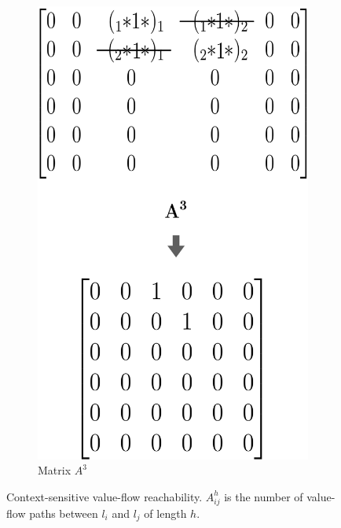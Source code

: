 \documentclass[xcolor=table,english]{beamer}
\begin{document}
\begin{frame}[fragile]
\begin{figure}[w]
\begin{subfigure}[b]{0.297\textwidth}
            \includegraphics[width=\textwidth]{figures/cfpq_3.png}
            \caption{Matrix $A^3$}
        \end{subfigure}
        \caption{Context-sensitive value-flow reachability. $A_{ij}^h$ is the number of value-flow paths between $l_i$ and $l_j$ of length $h$.}
    \end{figure}
\end{frame}
\end{document}
